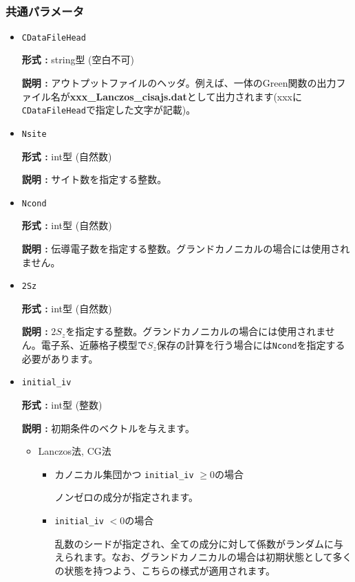 ~\subsubsection{共通パラメータ}

 \begin{itemize}
  \item  \verb|CDataFileHead|

 {\bf 形式 :} string型 (空白不可)

{\bf 説明 :} アウトプットファイルのヘッダ。例えば、一体のGreen関数の出力ファイル名が{\bf xxx\_Lanczos\_cisajs.dat}として出力されます(xxxに\verb|CDataFileHead|で指定した文字が記載)。
   
 \item  \verb|Nsite|

{\bf 形式 :} int型 (自然数)

{\bf 説明 :} サイト数を指定する整数。  

\item  \verb|Ncond|

{\bf 形式 :} {int型 (自然数)}

{\bf 説明 :} {伝導電子数を指定する整数。グランドカノニカルの場合には使用されません。}

 \item  \verb|2Sz|

{\bf 形式 :} {int型 (自然数)}

{\bf 説明 :} {$2S_z$を指定する整数。グランドカノニカルの場合には使用されません。電子系、近藤格子模型で$S_z$保存の計算を行う場合には}\verb|Ncond|を指定する必要があります。

 \item  \verb|initial_iv|

{\bf 形式 :} int型 (整数)

{\bf 説明 :} 
 {初期条件のベクトルを与えます。}
\begin{itemize}
\item{Lanczos法, CG法}
\begin{itemize}
\item{カノニカル集団かつ \verb|initial_iv| $\geq 0$の場合}

ノンゼロの成分が指定されます。

\item{ \verb|initial_iv| $< 0$の場合}

乱数のシードが指定され、全ての成分に対して係数がランダムに与えられます。なお、グランドカノニカルの場合は初期状態として多くの状態を持つよう、こちらの様式が適用されます。
\end{itemize}


\end{itemize}
\end{itemize}
